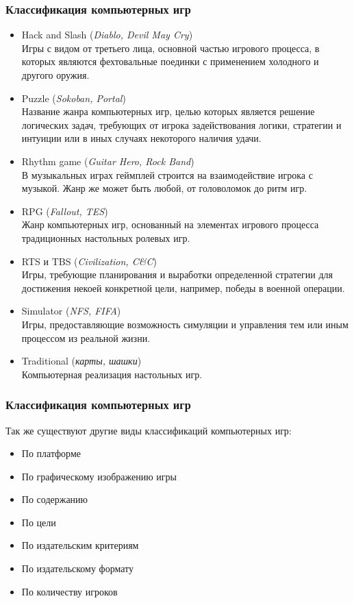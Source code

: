 \begin{frame}
    \frametitle{Классификация компьютерных игр}
    \begin{itemize}
        \item Hack and Slash (\emph{Diablo, Devil May Cry}) \\
            \tiny Игры с видом от третьего лица, основной частью игрового процесса, в которых 
            являются фехтовальные поединки с применением холодного и другого оружия.
        \item \normalsize Puzzle (\emph{Sokoban, Portal}) \\
            \tiny Название жанра компьютерных игр, целью которых является решение логических задач, 
            требующих от игрока задействования логики, стратегии и интуиции или в иных случаях 
            некоторого наличия удачи.
        \item \normalsize Rhythm game (\emph{Guitar Hero, Rock Band}) \\
            \tiny В музыкальных играх геймплей строится на взаимодействие игрока с музыкой. 
            Жанр же может быть любой, от головоломок до ритм игр.
        \item \normalsize RPG (\emph{Fallout, TES}) \\
            \tiny Жанр компьютерных игр, основанный на элементах игрового процесса традиционных 
            настольных ролевых игр.
        \item \normalsize RTS и TBS (\emph{Civilization, C\&C}) \\
            \tiny Игры, требующие планирования и выработки определенной стратегии для достижения 
            некоей конкретной цели, например, победы в военной операции.
        \item \normalsize Simulator (\emph{NFS, FIFA}) \\
            \tiny Игры, предоставляющие возможность симуляции и управления тем или иным процессом 
            из реальной жизни.
        \item \normalsize Traditional (\emph{карты, шашки}) \\
            \tiny Компьютерная реализация настольных игр.
    \end{itemize}
\end{frame}

\begin{frame}
    \frametitle{Классификация компьютерных игр}
    Так же существуют другие виды классификаций компьютерных игр:
    \begin{itemize}
        \item По платформе
        \item По графическому изображению игры
        \item По содержанию
        \item По цели
        \item По издательским критериям
        \item По издательскому формату
        \item По количеству игроков
    \end{itemize}
\end{frame}

